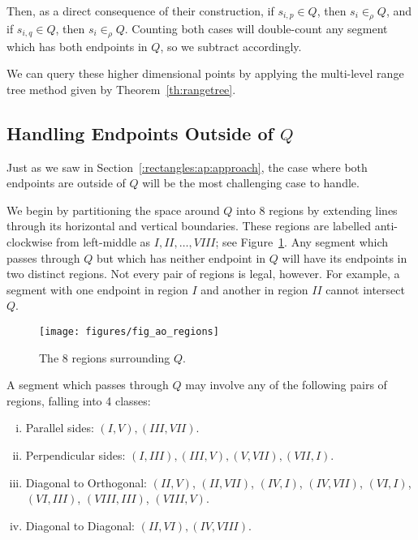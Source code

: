 Then, as a direct consequence of their construction, if $s_{i,p} \in Q$, then $s_i \in_\rho Q$, and if $s_{i,q} \in Q$, then $s_i \in_\rho Q$.
Counting both cases will double-count any segment which has both endpoints in $Q$, so we subtract accordingly.

We can query these higher dimensional points by applying the multi-level range tree method given by Theorem~\ref{th:rangetree}.


\subsection{Handling Endpoints Outside of $Q$}
\label{:rectangles:ao:bothout}

Just as we saw in Section~\ref{:rectangles:ap:approach}, the case where both endpoints are outside of $Q$ will be the most challenging case to handle.

We begin by partitioning the space around $Q$ into 8 regions by extending lines through its horizontal and vertical boundaries. 
These regions are labelled anti-clockwise from left-middle as $I, II, \ldots, VIII$; see Figure~\ref{fig:rectangles:ao:regions}. 
Any segment which passes through $Q$ but which has neither endpoint in $Q$ will have its endpoints in two distinct regions. 
Not every pair of regions is legal, however.
For example, a segment with one endpoint in region $I$ and another in region $II$ cannot intersect $Q$.

\begin{figure}[t]
\begin{center}
  \texttt{[image: figures/fig\_ao\_regions]}
  \caption{The 8 regions surrounding $Q$.}
  \label{fig:rectangles:ao:regions}
\end{center}
\end{figure}

A segment which passes through $Q$ may involve any of the following pairs of regions, falling into 4 classes:

\begin{enumerate}[i.]
\item Parallel sides: $(I, V), (III, VII)$.
\item Perpendicular sides: $(I, III), (III, V), (V,VII), (VII, I)$.
\item Diagonal to Orthogonal: $(II, V)$, $(II, VII)$, $(IV, I)$, $(IV, VII)$, $(VI, I)$, \newline $(VI, III)$, $(VIII, III)$, $(VIII, V)$.
\item Diagonal to Diagonal: $(II, VI), (IV, VIII)$.
\end{enumerate}


